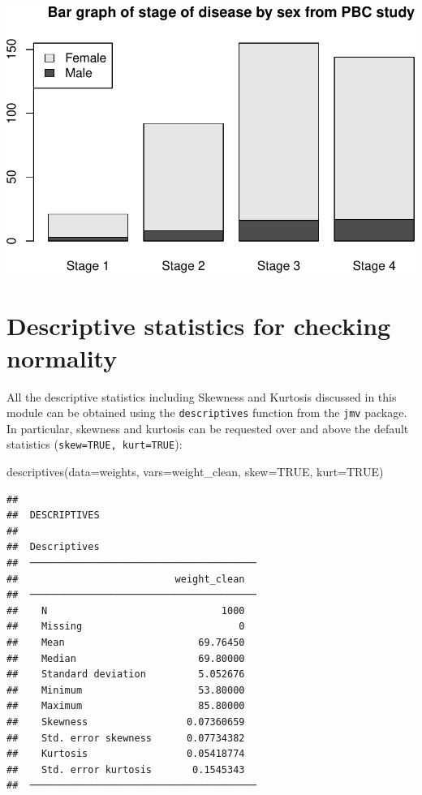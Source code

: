 \documentclass[
]{memoir}
\newenvironment{Shaded}{\begin{snugshade}}{\end{snugshade}}
\newcommand{\AttributeTok}[1]{\textcolor[rgb]{0.77,0.63,0.00}{#1}}
\newcommand{\ConstantTok}[1]{\textcolor[rgb]{0.00,0.00,0.00}{#1}}
\newcommand{\FunctionTok}[1]{\textcolor[rgb]{0.00,0.00,0.00}{#1}}
\newcommand{\NormalTok}[1]{#1}
\begin{document}
\includegraphics{phcm9795-R-notes_files/figure-latex/unnamed-chunk-45-1.pdf}

\hypertarget{descriptive-statistics-for-checking-normality}{%
\section{Descriptive statistics for checking normality}\label{descriptive-statistics-for-checking-normality}}

All the descriptive statistics including Skewness and Kurtosis discussed in this module can be obtained using the \texttt{descriptives} function from the \texttt{jmv} package. In particular, skewness and kurtosis can be requested over and above the default statistics (\texttt{skew=TRUE,\ kurt=TRUE}):

\begin{Shaded}
\begin{Highlighting}[]
\FunctionTok{descriptives}\NormalTok{(}\AttributeTok{data=}\NormalTok{weights, }\AttributeTok{vars=}\NormalTok{weight\_clean, }\AttributeTok{skew=}\ConstantTok{TRUE}\NormalTok{, }\AttributeTok{kurt=}\ConstantTok{TRUE}\NormalTok{)}
\end{Highlighting}
\end{Shaded}

\begin{verbatim}
## 
##  DESCRIPTIVES
## 
##  Descriptives                            
##  ─────────────────────────────────────── 
##                           weight_clean   
##  ─────────────────────────────────────── 
##    N                              1000   
##    Missing                           0   
##    Mean                       69.76450   
##    Median                     69.80000   
##    Standard deviation         5.052676   
##    Minimum                    53.80000   
##    Maximum                    85.80000   
##    Skewness                 0.07360659   
##    Std. error skewness      0.07734382   
##    Kurtosis                 0.05418774   
##    Std. error kurtosis       0.1545343   
##  ───────────────────────────────────────
\end{verbatim}
\end{document}
